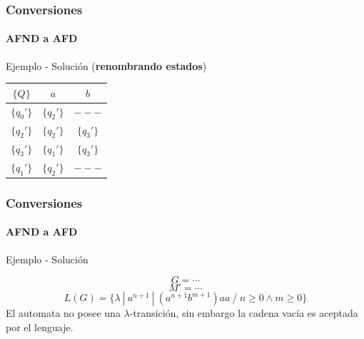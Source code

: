 \documentclass{beamer}
\begin{document}
        \begin{frame}
			\frametitle{Conversiones}
			\framesubtitle{AFND a AFD}

            \begin{exampleblock}{Ejemplo - Soluci\'on (\textbf{renombrando estados})}
               \begin{table}
                   \begin{center}
                       \begin{tabular}{c|c|c} 
                           $\{Q\}$ & $a$ & $b$\\ \hline
                           $\{q_{0}'\}$ & $\{q_{2}'\}$ & $---$ \\
                           $\{q_{2}'\}$ & $\{q_{2}'\}$ & $\{q_{3}'\}$ \\
                           $\{q_{3}'\}$ & $\{q_{1}'\}$ & $\{q_{3}'\}$ \\
                           $\{q_{1}'\}$ & $\{q_{2}'\}$ & $---$ \\
                       \end{tabular}
                   \end{center}
               \end{table}
            \end{exampleblock}
		\end{frame}			
		
        \begin{frame}
			\frametitle{Conversiones}
			\framesubtitle{AFND a AFD}

            \begin{exampleblock}{Ejemplo - Soluci\'on}
               \begin{center}
			       $$G = \cdots $$
			       $$M' = \cdots $$
			       $$L(G) = \{\lambda~|~a^{n+1}~|~(a^{n+1}b^{m+1})aa~/~n \geqslant 0 \wedge m \geqslant 0 \}$$
			       El automata no posee una $\lambda$-transici\'on, sin embargo la cadena vac\'ia es aceptada por el lenguaje.
			   \end{center}
            \end{exampleblock}
		\end{frame}		
		
\end{document}
